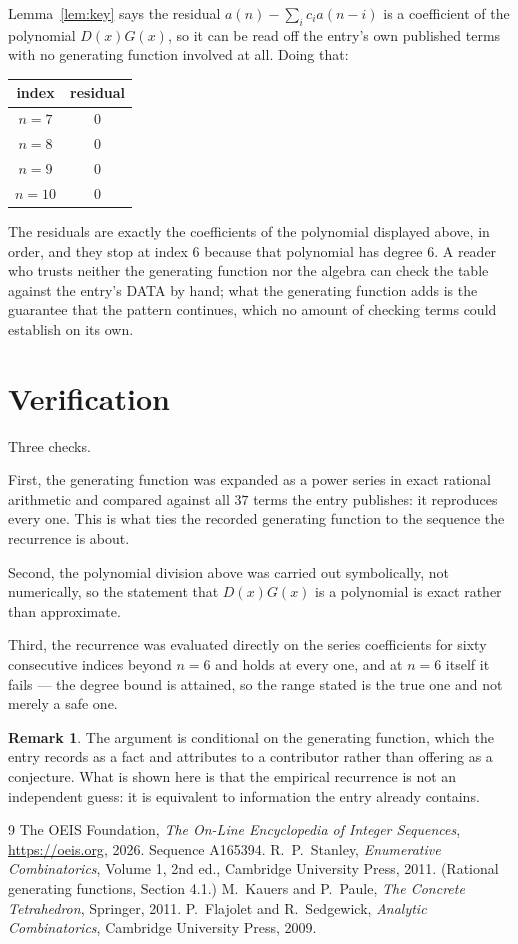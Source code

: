 \documentclass[11pt,a4paper]{article}
\theoremstyle{plain}
\theoremstyle{definition}
\newtheorem{remark}[theorem]{Remark}
\begin{document}
Lemma~\ref{lem:key} says the residual $a(n)-\sum_ic_ia(n-i)$ is a coefficient of the
polynomial $D(x)G(x)$, so it can be read off the entry's own published terms with no
generating function involved at all. Doing that:
\begin{center}
\begin{tabular}{cc}
index & residual \\ \hline
$n=7$ & $0$ \\
$n=8$ & $0$ \\
$n=9$ & $0$ \\
$n=10$ & $0$
\end{tabular}
\end{center}
The residuals are exactly the coefficients of the polynomial displayed above, in order, and
they stop at index $6$ because that polynomial has degree $6$. A reader who trusts
neither the generating function nor the algebra can check the table against the entry's DATA
by hand; what the generating function adds is the guarantee that the pattern continues, which
no amount of checking terms could establish on its own.

\section{Verification}

Three checks.

First, the generating function was expanded as a power series in exact rational arithmetic and
compared against all $37$ terms the entry publishes: it reproduces every one. This is
what ties the recorded generating function to the sequence the recurrence is about.

Second, the polynomial division above was carried out symbolically, not numerically, so the
statement that $D(x)G(x)$ is a polynomial is exact rather than approximate.

Third, the recurrence was evaluated directly on the series coefficients for sixty consecutive
indices beyond $n=6$ and holds at every one, and at $n=6$ itself it fails --- the
degree bound is attained, so the range stated is the true one and not merely a safe one.

\begin{remark}
The argument is conditional on the generating function, which the entry records as a fact and
attributes to a contributor rather than offering as a conjecture. What is shown here is that
the empirical recurrence is not an independent guess: it is equivalent to information the
entry already contains.
\end{remark}

\begin{thebibliography}{9}
 The OEIS Foundation, \emph{The On-Line Encyclopedia of Integer
Sequences}, \url{https://oeis.org}, 2026. Sequence A165394.
 R.~P.~Stanley, \emph{Enumerative Combinatorics}, Volume 1, 2nd ed.,
Cambridge University Press, 2011. (Rational generating functions, Section 4.1.)
 M.~Kauers and P.~Paule, \emph{The Concrete Tetrahedron}, Springer, 2011.
 P.~Flajolet and R.~Sedgewick, \emph{Analytic Combinatorics}, Cambridge
University Press, 2009.
\end{thebibliography}
\end{document}
